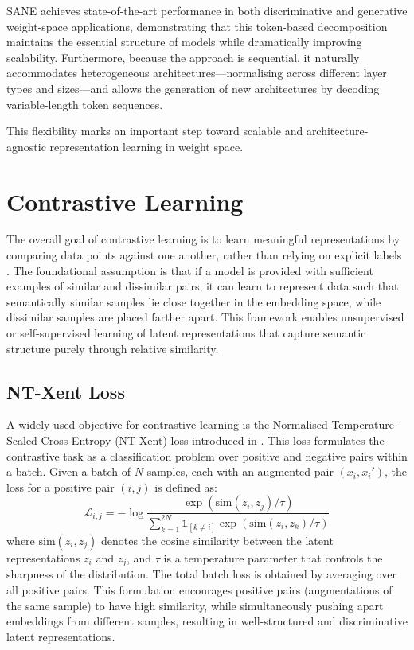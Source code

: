 SANE achieves state-of-the-art performance in both discriminative and generative weight-space applications, demonstrating that this token-based decomposition maintains the essential structure of models while dramatically improving scalability. Furthermore, because the approach is sequential, it naturally accommodates heterogeneous architectures—normalising across different layer types and sizes—and allows the generation of new architectures by decoding variable-length token sequences.  

This flexibility marks an important step toward scalable and architecture-agnostic representation learning in weight space.

\section{Contrastive Learning}
\label{sec:contrastive}
The overall goal of contrastive learning is to learn meaningful representations by comparing data points against one another, rather than relying on explicit labels \cite{}. The foundational assumption is that if a model is provided with sufficient examples of similar and dissimilar pairs, it can learn to represent data such that semantically similar samples lie close together in the embedding space, while dissimilar samples are placed farther apart. This framework enables unsupervised or self-supervised learning of latent representations that capture semantic structure purely through relative similarity.

\subsection{NT-Xent Loss}
\label{sec:nxtne_loss}
A widely used objective for contrastive learning is the Normalised Temperature-Scaled Cross Entropy (NT-Xent) loss introduced in \cite{}. This loss formulates the contrastive task as a classification problem over positive and negative pairs within a batch.  
Given a batch of $N$ samples, each with an augmented pair $(x_i, x_i')$, the loss for a positive pair $(i, j)$ is defined as:
\begin{equation}
  \mathcal{L}_{i,j} = -\log \frac{\exp(\text{sim}(z_i, z_j) / \tau)}{\sum_{k=1}^{2N} \mathbb{1}_{[k \neq i]} \exp(\text{sim}(z_i, z_k) / \tau)}
  \label{eq:nt-xent_loss}
\end{equation}
where $\text{sim}(z_i, z_j)$ denotes the cosine similarity between the latent representations $z_i$ and $z_j$, and $\tau$ is a temperature parameter that controls the sharpness of the distribution. The total batch loss is obtained by averaging over all positive pairs.  
This formulation encourages positive pairs (augmentations of the same sample) to have high similarity, while simultaneously pushing apart embeddings from different samples, resulting in well-structured and discriminative latent representations.

